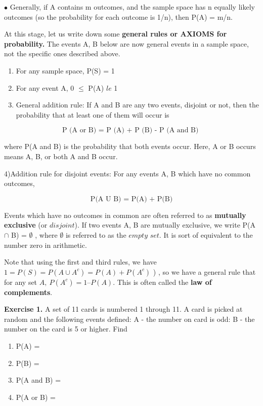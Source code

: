 \documentclass[
]{book}
\providecommand{\tightlist}{%
  \setlength{\itemsep}{0pt}\setlength{\parskip}{0pt}}
\begin{document}
\(\bullet\) Generally, if A contains m outcomes, and the sample space has n equally likely outcomes (so the probability for each outcome is 1/n), then P(A) = m/n.

At this stage, let us write down some \textbf{general rules or AXIOMS for probability.} The events A, B below are now general events in a sample space, not the specific ones described above.

\begin{enumerate}
\def\labelenumi{\arabic{enumi})}
\tightlist
\item
  For any sample space, P(S) = 1
\item
  For any event A, 0 \(\le\) P(A) \(le\) 1
\item
  General addition rule: If A and B are any two events, disjoint or not, then the probability that at least one of them will occur is
\end{enumerate}

\[
\text{P (A or B) = P (A) + P (B) - P (A and B) }
\]

where P(A and B) is the probability that both events occur. Here, A or B occurs means A, B, or both A and B occur.

4)Addition rule for disjoint events: For any events A, B which have no common outcomes,

\[
\text{P(A U B) = P(A) + P(B)}
\]

Events which have no outcomes in common are often referred to as \textbf{mutually exclusive} (or \(\textit{disjoint}\)). If two events A, B are mutually exclusive, we write P(A \(\cap\) B) = \(\emptyset\) , where \(\emptyset\) is referred to as the \(\textit{empty set}\). It is sort of equivalent to the number zero in arithmetic.

Note that using the first and third rules, we have \(1 = P(S) = P(A \cup A^c) = P(A) + P(A^c)\) ) , so we have a general rule that for any set \(A, \ P(A^c) = 1 – P(A)\). This is often called the \textbf{law of complements}.

\textbf{Exercise 1.} A set of 11 cards is numbered 1 through 11. A card is picked at random and the following events defined: A - the number on card is odd: B - the number on the card is 5 or higher. Find

\begin{enumerate}
\def\labelenumi{\alph{enumi})}
\item
  P(A) =
\item
  P(B) =
\item
  P(A and B) =
\item
  P(A or B) =
\end{enumerate}
\end{document}
